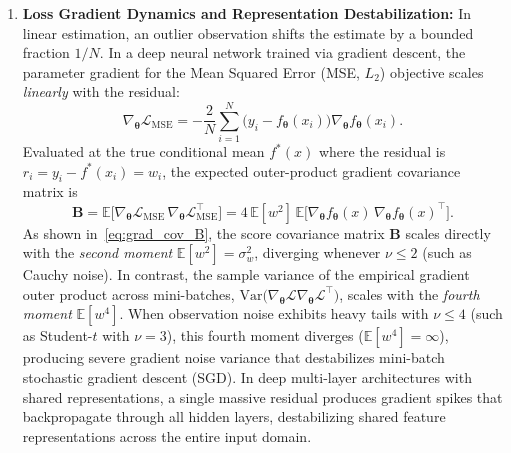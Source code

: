 \begin{enumerate}
  \item \textbf{Loss Gradient Dynamics and Representation Destabilization:} In linear estimation, an outlier observation shifts the estimate by a bounded fraction $1/N$. In a deep neural network trained via gradient descent, the parameter gradient for the Mean Squared Error (MSE, $L_2$) objective scales \emph{linearly} with the residual:
  \begin{equation}
    \nabla_{\boldsymbol{\theta}} \mathcal{L}_{\text{MSE}} = -\frac{2}{N}\sum_{i=1}^N \big(y_i - f_{\boldsymbol{\theta}}(x_i)\big) \nabla_{\boldsymbol{\theta}} f_{\boldsymbol{\theta}}(x_i).
    \label{eq:mse_grad}
  \end{equation}
  Evaluated at the true conditional mean $f^*(x)$ where the residual is $r_i = y_i - f^*(x_i) = w_i$, the expected outer-product gradient covariance matrix is
  \begin{equation}
    \mathbf{B} = \mathbb{E}\big[\nabla_{\boldsymbol{\theta}}\mathcal{L}_{\text{MSE}} \, \nabla_{\boldsymbol{\theta}}\mathcal{L}_{\text{MSE}}^\top\big] = 4\,\mathbb{E}[w^2] \, \mathbb{E}\big[\nabla_{\boldsymbol{\theta}} f_{\boldsymbol{\theta}}(x) \, \nabla_{\boldsymbol{\theta}} f_{\boldsymbol{\theta}}(x)^\top\big].
    \label{eq:grad_cov_B}
  \end{equation}
  As shown in~\eqref{eq:grad_cov_B}, the score covariance matrix $\mathbf{B}$ scales directly with the \emph{second moment} $\mathbb{E}[w^2] = \sigma_w^2$, diverging whenever $\nu \leq 2$ (such as Cauchy noise). In contrast, the sample variance of the empirical gradient outer product across mini-batches, $\mathrm{Var}\big(\nabla_{\boldsymbol{\theta}}\mathcal{L} \nabla_{\boldsymbol{\theta}}\mathcal{L}^\top\big)$, scales with the \emph{fourth moment} $\mathbb{E}[w^4]$. When observation noise exhibits heavy tails with $\nu \leq 4$ (such as Student-$t$ with $\nu = 3$), this fourth moment diverges ($\mathbb{E}[w^4] = \infty$), producing severe gradient noise variance that destabilizes mini-batch stochastic gradient descent (SGD). In deep multi-layer architectures with shared representations, a single massive residual produces gradient spikes that backpropagate through all hidden layers, destabilizing shared feature representations across the entire input domain.


\end{enumerate}
